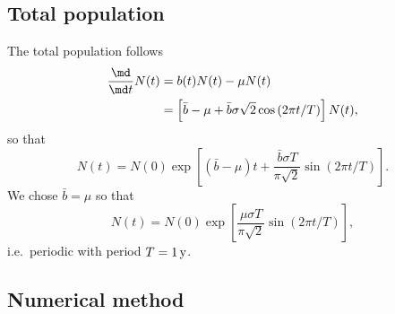 \documentclass{jpmarticle}
\begin{document}
\subsection{Total population}

The total population follows
\begin{equation}
  \label{model_unstructured_total}
  \begin{split}
    \frac{\md}{\md t} N(t)
    &= b(t) N(t) - \mu N(t)
    \\
    &= \left[
      \bar{b} - \mu
      + \bar{b} \sigma \sqrt{2} \cos\left(2 \pi t / T\right)
    \right]
    N(t),
  \end{split}
\end{equation}
so that
\begin{equation}
  N(t) = N(0) \exp\left[
    \left(\bar{b} - \mu\right) t
    + \frac{\bar{b} \sigma T}{\pi \sqrt{2}}
    \sin\left(2 \pi t / T\right)
  \right].
\end{equation}
We chose $\bar{b} = \mu$ so that
\begin{equation}
  N(t) = N(0) \exp\left[
    \frac{\mu \sigma T}{\pi \sqrt{2}}
    \sin\left(2 \pi t / T\right)
  \right],
\end{equation}
i.e.~periodic with period $T = \unit[1]{y}$.


\subsection{Numerical method}
\end{document}
